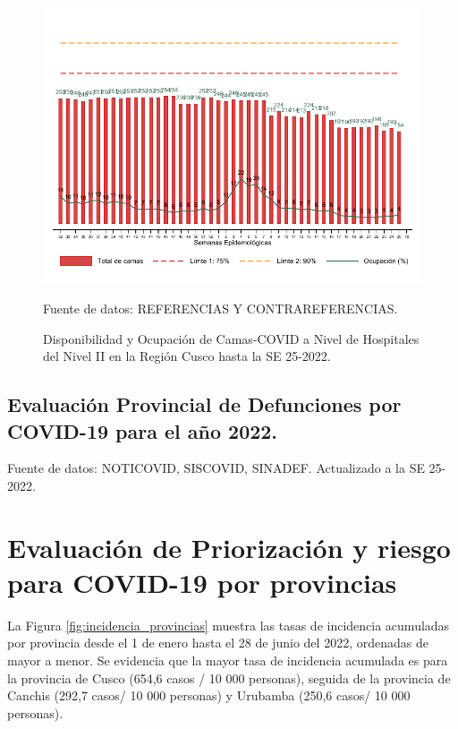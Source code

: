 \documentclass[12pt,a4paper,openany]{book}
\begin{document}
	\begin{figure}[h]
		\caption{Disponibilidad y Ocupación de Camas-COVID a Nivel de Hospitales del Nivel II en la Región Cusco hasta la SE 25-2022.}\label{fig:ocupacion_2nivel}
		\begin{center}
			\includegraphics[width=0.95\linewidth]{../figuras/nivel_2.pdf}
		\end{center}
		{\footnotesize {Fuente de datos: REFERENCIAS Y CONTRAREFERENCIAS.}}
	\end{figure}
	\clearpage
	\begin{landscape}
		
		\subsection*{Evaluación Provincial de Defunciones por COVID-19 para el año 2022.} 
		
		
		
		
		{\footnotesize Fuente de datos: NOTICOVID, SISCOVID, SINADEF. Actualizado a la SE 25-2022.}
		
		\noindent 
		
	\end{landscape}
	
	
	\clearpage
	
	\section*{Evaluación de Priorización y riesgo para COVID-19 por provincias}
	\noindent La Figura \ref{fig:incidencia_provincias} muestra las tasas de incidencia acumuladas por provincia desde el 1 de enero hasta el 28 de junio del 2022, ordenadas de mayor a menor. Se evidencia que la mayor tasa de incidencia acumulada es para la provincia de Cusco (654,6 casos / 10 000 personas), seguida de la provincia de Canchis (292,7 casos/ 10 000 personas) y Urubamba (250,6 casos/ 10 000 personas).
	
\end{document}
